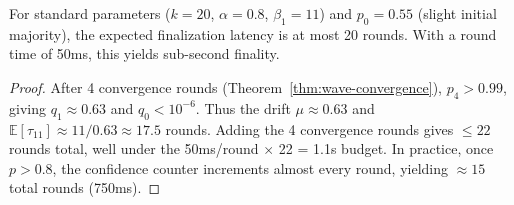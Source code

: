 \begin{proposition}
\label{prop:latency}
For standard parameters ($k = 20$, $\alpha = 0.8$, $\beta_1 = 11$) and $p_0 = 0.55$
(slight initial majority), the expected finalization latency is at most 20 rounds.
With a round time of 50ms, this yields sub-second finality.
\end{proposition}

\begin{proof}
After 4 convergence rounds (Theorem~\ref{thm:wave-convergence}), $p_4 > 0.99$, giving
$q_1 \approx 0.63$ and $q_0 < 10^{-6}$. Thus the drift $\mu \approx 0.63$ and
$\mathbb{E}[\tau_{11}] \approx 11/0.63 \approx 17.5$ rounds. Adding the 4 convergence
rounds gives $\leq 22$ rounds total, well under the 50ms/round $\times$ 22 = 1.1s budget.
In practice, once $p > 0.8$, the confidence counter increments almost every round,
yielding $\approx 15$ total rounds (750ms).
\end{proof}

